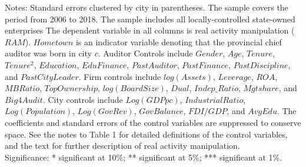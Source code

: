 \begin{table}[p]
\begin{threeparttable}
\begin{tablenotes}
\item Notes: Standard errors clustered by city in parentheses. The sample covers the period from 2006 to 2018. The sample includes all locally-controlled state-owned enterprises The dependent variable in all columns is real activity manipulation ($ RAM $). $ Hometown $ is an indicator variable denoting that the provincial chief auditor was born in city $ c $. Auditor Controls include $ Gender $, $ Age $, $ Tenure $, $ Tenure^2 $, $ Education $, $ EduFinance $, $ PastAuditor $, $ PastFinance $, $ PastDiscipline $, and $ PastCityLeader $. Firm controls include $ log(Assets) $, $ Leverage $, $ ROA $, $ MBRatio $, $ TopOwnership $, $ log(BoardSize) $, $ Dual $, $ Indep\_Ratio $, $ Mgtshare $, and $ Big4Audit $. City controls include $ Log(GDP pc) $, $ IndustrialRatio $, $ Log(Population) $, $ Log(GovRev) $, $ GovBalance $, $ FDI/GDP $, and $ AvgEdu $. The coefficients and standard errors of the control variables are suppressed to conserve space. See the notes to Table 1 for detailed definitions of the control variables, and the text for further description of real activity manipulation.   \\  Significance: * significant at 10\%; ** significant at 5\%; *** significant at 1\%.
\end{tablenotes}
\end{threeparttable}\end{table}
